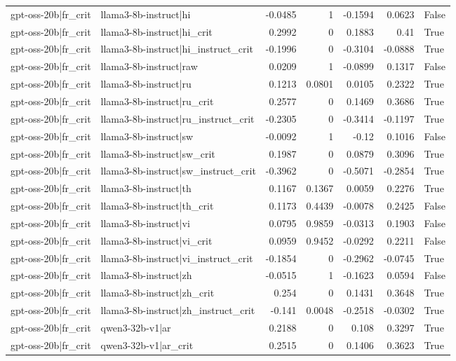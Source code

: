 \begin{table}
\begin{tabular}{l l r r r r l}
gpt-oss-20b|fr_crit & llama3-8b-instruct|hi & -0.0485 & 1 & -0.1594 & 0.0623 & False \\
gpt-oss-20b|fr_crit & llama3-8b-instruct|hi_crit & 0.2992 & 0 & 0.1883 & 0.41 & True \\
gpt-oss-20b|fr_crit & llama3-8b-instruct|hi_instruct_crit & -0.1996 & 0 & -0.3104 & -0.0888 & True \\
gpt-oss-20b|fr_crit & llama3-8b-instruct|raw & 0.0209 & 1 & -0.0899 & 0.1317 & False \\
gpt-oss-20b|fr_crit & llama3-8b-instruct|ru & 0.1213 & 0.0801 & 0.0105 & 0.2322 & True \\
gpt-oss-20b|fr_crit & llama3-8b-instruct|ru_crit & 0.2577 & 0 & 0.1469 & 0.3686 & True \\
gpt-oss-20b|fr_crit & llama3-8b-instruct|ru_instruct_crit & -0.2305 & 0 & -0.3414 & -0.1197 & True \\
gpt-oss-20b|fr_crit & llama3-8b-instruct|sw & -0.0092 & 1 & -0.12 & 0.1016 & False \\
gpt-oss-20b|fr_crit & llama3-8b-instruct|sw_crit & 0.1987 & 0 & 0.0879 & 0.3096 & True \\
gpt-oss-20b|fr_crit & llama3-8b-instruct|sw_instruct_crit & -0.3962 & 0 & -0.5071 & -0.2854 & True \\
gpt-oss-20b|fr_crit & llama3-8b-instruct|th & 0.1167 & 0.1367 & 0.0059 & 0.2276 & True \\
gpt-oss-20b|fr_crit & llama3-8b-instruct|th_crit & 0.1173 & 0.4439 & -0.0078 & 0.2425 & False \\
gpt-oss-20b|fr_crit & llama3-8b-instruct|vi & 0.0795 & 0.9859 & -0.0313 & 0.1903 & False \\
gpt-oss-20b|fr_crit & llama3-8b-instruct|vi_crit & 0.0959 & 0.9452 & -0.0292 & 0.2211 & False \\
gpt-oss-20b|fr_crit & llama3-8b-instruct|vi_instruct_crit & -0.1854 & 0 & -0.2962 & -0.0745 & True \\
gpt-oss-20b|fr_crit & llama3-8b-instruct|zh & -0.0515 & 1 & -0.1623 & 0.0594 & False \\
gpt-oss-20b|fr_crit & llama3-8b-instruct|zh_crit & 0.254 & 0 & 0.1431 & 0.3648 & True \\
gpt-oss-20b|fr_crit & llama3-8b-instruct|zh_instruct_crit & -0.141 & 0.0048 & -0.2518 & -0.0302 & True \\
gpt-oss-20b|fr_crit & qwen3-32b-v1|ar & 0.2188 & 0 & 0.108 & 0.3297 & True \\
gpt-oss-20b|fr_crit & qwen3-32b-v1|ar_crit & 0.2515 & 0 & 0.1406 & 0.3623 & True \\

\end{tabular}
\end{table}
